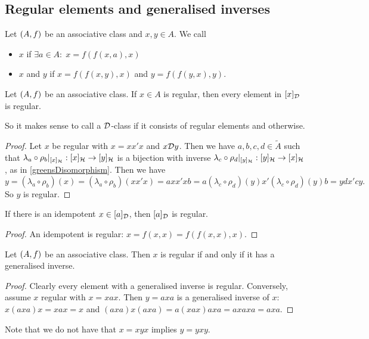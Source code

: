 \subsection{Regular elements and generalised inverses}
\begin{definition}
Let $\left( A, f \right)$ be an associative class and $x, y\in A$. We call
\begin{itemize}
\item $x$  if $\exists a\in A: \; x = f(f(x, a), x)$
\item $x$ and $y$  if $x = f(f(x, y), x)$ and $y = f(f(y, x), y)$.
\end{itemize}
\end{definition}

\begin{proposition} 
Let $\left( A, f \right)$ be an associative class. If $x\in A$ is regular, then every element in $[x]_{\mathcal{D}}$ is regular.
\end{proposition}
So it makes sense to call a $\mathcal{D}$-class  if it consists of regular elements and  otherwise.
\begin{proof}
Let $x$ be regular with $x = xx'x$ and $x\mathcal{D} y$. Then we have $a,b,c,d \in \widetilde{A}$ such that
$\lambda_a\circ\rho_b|_{[x]_{\mathcal{H}}}: [x]_{\mathcal{H}} \to [y]_{\mathcal{H}}$ is a bijection with inverse $\lambda_c\circ \rho_d|_{[y]_{\mathcal{H}}}: [y]_{\mathcal{H}} \to [x]_{\mathcal{H}}$, as in \ref{greensDisomorphism}. Then we have
\[ y = (\lambda_a\circ\rho_b)(x) = (\lambda_a\circ\rho_b)(xx'x) = axx'xb = a(\lambda_c\circ\rho_d)(y)x'(\lambda_c\circ\rho_d)(y)b = ydx'cy. \]
So $y$ is regular.
\end{proof}
\begin{corollary}
If there is an idempotent $x\in [a]_{\mathcal{D}}$, then $[a]_{\mathcal{D}}$ is regular.
\end{corollary}
\begin{proof}
An idempotent is regular: $x = f(x,x) = f(f(x,x), x)$.
\end{proof}

\begin{proposition}
Let $\left( A, f \right)$ be an associative class. Then $x$ is regular \textup{if and only if} it has a generalised inverse.
\end{proposition}
\begin{proof}
Clearly every element with a generalised inverse is regular. Conversely, assume $x$ regular with $x = xax$. Then $y = axa$ is a generalised inverse of $x$: $x(axa)x = xax = x$ and $(axa)x(axa) = a(xax)axa = axaxa = axa$.
\end{proof}
Note that we do not have that $x = xyx$ implies $y = yxy$.

